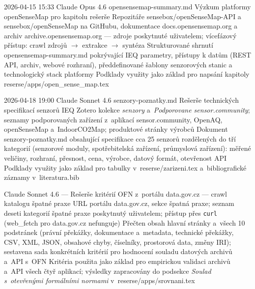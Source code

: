
\logentry
  {2026-04-15 15:33}
  {Claude Opus 4.6}
  {opensensemap-summary.md}
  {Výzkum platformy openSenseMap pro kapitolu rešerše}
  {Repozitáře sensebox/openSenseMap-API a sensebox/openSenseMap na GitHubu, dokumentace docs.opensensemap.org a archiv archive.opensensemap.org — zdroje poskytnuté uživatelem; vícefázový přístup: crawl zdrojů $\rightarrow$ extrakce $\rightarrow$ syntéza}
  {Strukturované shrnutí opensensemap-summary.md pokrývající IEQ parametry, přístupy k datům (REST API, archiv, webové rozhraní), předdefinované šablony senzorových stanic a technologický stack platformy}
  {Podklady využity jako základ pro napsání kapitoly reserse/apps/open\_sense\_map.tex}

\logentry
  {2026-04-18 19:00}
  {Claude Sonnet 4.6}
  {senzory-poznatky.md}
  {Rešerše technických specifikací senzorů IEQ}
  {Zotero kolekce \textit{senzory} a~\textit{Podporovane sensor.community}; seznamy podporovaných zařízení z~aplikací sensor.community, OpenAQ, openSenseMap a~IndoorCO2Map; produktové stránky výrobců}
  {Dokument senzory-poznatky.md obsahující specifikace cca 25 senzorů rozdělených do tří kategorií (senzorové moduly, spotřebitelská zařízení, průmyslová zařízení): měřené veličiny, rozhraní, přesnost, cena, výrobce, datový formát, otevřenost API}
  {Podklady využity jako základ pro tabulky v~reserse/zarizeni.tex a~bibliografické záznamy v~literatura.bib}


  {Claude Sonnet 4.6}
  {—}
  {Rešerše kritérií OFN z~portálu data.gov.cz — crawl katalogu špatné praxe}
  {URL portálu data.gov.cz, sekce špatná praxe; seznam deseti kategorií špatné praxe poskytnutý uživatelem; přístup přes \texttt{curl} (web\_fetch pro data.gov.cz nefunguje)}
  {Přečten obsah hlavní stránky a~všech 10 podstránek (právní překážky, dokumentace a~metadata, technické překážky, CSV, XML, JSON, obsahové chyby, číselníky, prostorová data, změny IRI); sestavena sada konkrétních kritérií pro hodnocení souladu datových archivů a~API s~OFN}
  {Kritéria použita jako základ pro empirickou validaci archivů a~API všech čtyř aplikací; výsledky zapracovány do podsekce \textit{Soulad s~otevřenými formálními normami} v~reserse/apps/srovnani.tex}
